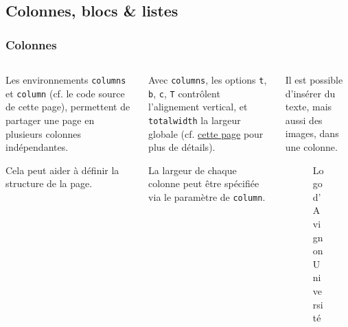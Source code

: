 \documentclass[10pt,    %
    french,             %
    xcolor=table,       %
    envcountsect,       %
    aspectratio=43      %
]{beamer}
\begin{document}
\subsection{Colonnes, blocs \& listes}
\begin{frame}
    \frametitle{Colonnes}
    
    \begin{columns}[T,totalwidth=\textwidth] %
        \begin{column}{0.33\textwidth}
            Les environnements \texttt{columns} et \texttt{column} (cf. le code source de cette page), permettent de partager une page en plusieurs colonnes indépendantes. 
            
            Cela peut aider à définir la structure de la page.
        \end{column}
        
        \begin{column}{0.33\textwidth}
            Avec \texttt{columns}, les options \texttt{t}, \texttt{b}, \texttt{c}, \texttt{T} contrôlent l'alignement vertical, et \texttt{totalwidth} la largeur globale (cf. \href{https://tex.stackexchange.com/a/51509/31360}{cette page} pour plus de détails).
            
            La largeur de chaque colonne peut être spécifiée via le paramètre de \texttt{column}.
        \end{column}
        
        \begin{column}{0.33\textwidth}
            Il est possible d'insérer du texte, mais aussi des images, dans une colonne.
            \begin{figure}[H]
                \centering
                \href{http://univ-avignon.fr}{}
                \vspace{-0.5cm}
                \caption{Logo d'Avignon Université}
                \label{fig:AUlogo}
            \end{figure}
        \end{column}
    \end{columns}


\end{frame}
\end{document}
